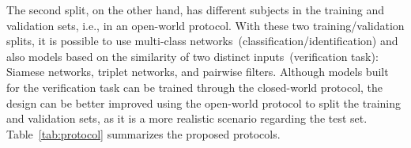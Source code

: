 \documentclass[journal]{IEEEtran}
\begin{document}
The second split, on the other hand, has different subjects in the training and validation sets, i.e., in an open-world protocol.
With these two training/validation splits, it is possible to use multi-class networks~(classification/identification) and also models based on the similarity of two distinct inputs~(verification task): Siamese networks, triplet networks, and pairwise filters.
Although models built for the verification task can be trained through the closed-world protocol, the design can be better improved using the open-world protocol to split the training and validation sets, as it is a more realistic scenario regarding the test set.
Table~\ref{tab:protocol} summarizes the proposed protocols.

\begin{table*}[!ht]
\centering
\caption{Images, Classes, and Pairwise comparison distributions for the closed-world~(CW) and open-world~(OW) protocols. Values for each fold (3 folds).}

\vspace{-1.5mm}

\label{tab:protocol}
\end{table*}
\end{document}
